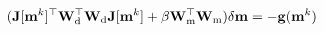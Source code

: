 \begin{equation}
(\mathbf{J}[\mathbf{m}^k]^\top \mathbf{W}_{\rm d}^\top \mathbf{W}_{\rm d} \mathbf{J}[\mathbf{m}^k] + \beta \mathbf{W}_{\rm m}^\top \mathbf{W}_{\rm m}) \delta \mathbf{m} = -\mathbf{g}(\mathbf{m}^k)
\label{eq:gauss_newton}
\end{equation}
